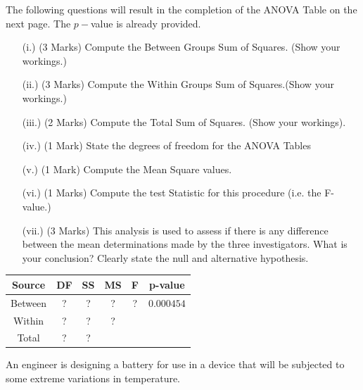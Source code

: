 \noindent The following questions will result in the completion of the ANOVA Table on the next page. The $p-$value is already provided.
\begin{itemize}
	\item[(i.)](3 Marks) Compute the Between Groups Sum of Squares. (Show your workings.)
	\item[(ii.)](3 Marks) Compute the Within Groups Sum of Squares.(Show your workings.)
	\item[(iii.)](2 Marks) Compute the Total Sum of Squares. (Show your workings).
	\item[(iv.)] (1 Mark) State the degrees of freedom for the ANOVA Tables
	\item[(v.)] (1 Mark) Compute the Mean Square values.
	\item[(vi.)] (1 Marks) Compute the test Statistic for this procedure (i.e. the F-value.)
	\item[(vii.)] (3 Marks) This analysis is used to assess if there is any difference between the mean determinations made by the three investigators. What is your conclusion? Clearly state the null and alternative hypothesis.
\end{itemize}
\begin{center}
	\begin{tabular}{|c||c|c|c|c|c|}
		\hline Source & DF & SS & MS & F & p-value \\ \hline 
		\hline Between & \phantom{mak} ? \phantom{mak}  & \phantom{mak} ? \phantom{mak}  & \phantom{mak} ? \phantom{mak}  & \phantom{mak} ? \phantom{mak}  &  $0.000454$ \\ 
		\hline Within &  ? & ? & \phantom{mak} ? \phantom{mak}  &  &  \\ 
		\hline \hline Total & ? & ? &  &  &  \\ 
		\hline 
	\end{tabular}
\end{center} 



\item[(d)]


An engineer is designing a battery for use in a device that will be subjected to some extreme variations in temperature. 

